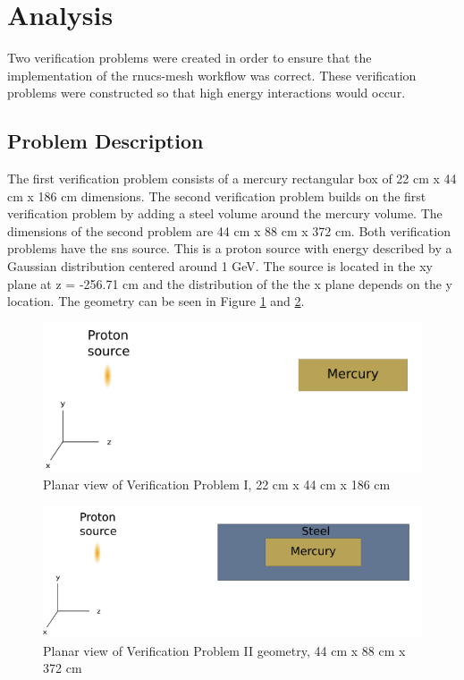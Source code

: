 \section{Analysis}\label{sc:analysis}
Two verification problems were created in order to ensure
that the implementation of the rnucs-mesh workflow was correct.
These verification problems were constructed so that
high energy interactions would occur.

\subsection{Problem Description}
The first verification problem consists of a mercury rectangular box of 22 cm
x 44 cm x 186 cm dimensions. The second verification problem builds on the
first verification problem by adding a steel volume around the mercury volume.
The dimensions of the second problem are 44 cm x 88 cm x 372 cm.
Both verification problems have the \gls{sns} source. This is a proton source
with energy described by a Gaussian distribution centered around 1 GeV.
The source is located in the xy
plane at z = -256.71 cm and the distribution of the the x plane depends on the
y location. The geometry can be seen in Figure \ref{fig:VPI} and \ref{fig:VPII}.
%
\begin{figure}[h!]
	\centering
	\includegraphics[scale=0.7]{../figs/mercury.png}
	\caption[VPI]{Planar view of Verification Problem I, 22 cm  x 44 cm x 186 cm}
	\label{fig:VPI}
\end{figure}
\begin{figure}[h!]
	\centering
	\includegraphics[scale=0.71]{../figs/mer_steel.png}
	\caption[VPI]{Planar view of Verification Problem II geometry, 44 cm x 88 cm x 372 cm}
	\label{fig:VPII}
\end{figure}

